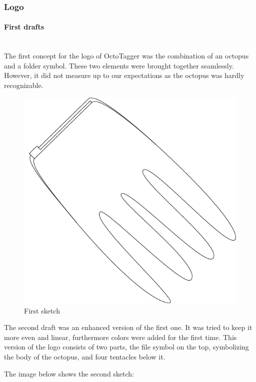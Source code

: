 \subsubsection{Logo}

\paragraph{First drafts} \hspace{0pt} \\

The first concept for the logo of OctoTagger was the combination of an octopus and a folder symbol. These two elements were brought together seamlessly. However, it did not measure up to our expectations as the octopus was hardly recognizable. 

\begin{figure}
\centering
\includegraphics[scale=0.30]{images/logo_v01.png}
\caption{First sketch}
\end{figure}

The second draft was an enhanced version of the first one. It was tried to keep it more even and linear, furthermore colors were added for the first time. This version of the logo consists of two parts, the file symbol on the top, symbolizing the body of the octopus, and four tentacles below it.

The image below shows the second sketch:

